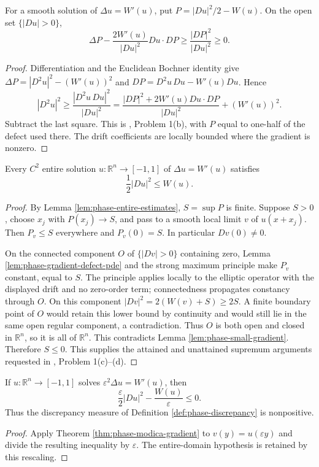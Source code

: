 \begin{lemma}\label{lem:phase-gradient-defect-pde}
For a smooth solution of $\Delta u=W'(u)$, put $P=|Du|^2/2-W(u)$. On the open set $\{|Du|>0\}$,
\[
 \Delta P-\frac{2W'(u)}{|Du|^2}Du\cdot DP
 \geq\frac{|DP|^2}{|Du|^2}\geq0.
\]
\end{lemma}
\begin{proof}
Differentiation and the Euclidean Bochner identity give
$\Delta P=|D^2u|^2-(W'(u))^2$ and $DP=D^2u\,Du-W'(u)Du$. Hence
\[
 |D^2u|^2\geq\frac{|D^2u\,Du|^2}{|Du|^2}
 =\frac{|DP|^2+2W'(u)Du\cdot DP}{|Du|^2}+(W'(u))^2.
\]
Subtract the last square. This is \cite{ChAC}, Problem 1(b), with $P$ equal to one-half of the defect used there. The drift coefficients are locally bounded where the gradient is nonzero.
\end{proof}

\begin{theorem}\label{thm:phase-modica-gradient}
Every $C^2$ entire solution $u:\mathbb R^n\to[-1,1]$ of $\Delta u=W'(u)$ satisfies
\[
 \frac12|Du|^2\leq W(u).
\]
\end{theorem}
\begin{proof}
By Lemma \ref{lem:phase-entire-estimates}, $S=\sup P$ is finite. Suppose $S>0$, choose $x_j$ with $P(x_j)\to S$, and pass to a smooth local limit $v$ of $u(x+x_j)$. Then $P_v\leq S$ everywhere and $P_v(0)=S$. In particular $Dv(0)\ne0$.

On the connected component $O$ of $\{|Dv|>0\}$ containing zero, Lemma \ref{lem:phase-gradient-defect-pde} and the strong maximum principle make $P_v$ constant, equal to $S$. The principle applies locally to the elliptic operator with the displayed drift and no zero-order term; connectedness propagates constancy through $O$. On this component $|Dv|^2=2(W(v)+S)\geq2S$. A finite boundary point of $O$ would retain this lower bound by continuity and would still lie in the same open regular component, a contradiction. Thus $O$ is both open and closed in $\mathbb R^n$, so it is all of $\mathbb R^n$. This contradicts Lemma \ref{lem:phase-small-gradient}. Therefore $S\leq0$. This supplies the attained and unattained supremum arguments requested in \cite{ChAC}, Problem 1(c)--(d).
\end{proof}

\begin{corollary}\label{cor:phase-modica-scaled}
If $u:\mathbb R^n\to[-1,1]$ solves $\varepsilon^2\Delta u=W'(u)$, then
\[
 \frac\varepsilon2|Du|^2-\frac{W(u)}\varepsilon\leq0.
\]
Thus the discrepancy measure of Definition \ref{def:phase-discrepancy} is nonpositive.
\end{corollary}
\begin{proof}
Apply Theorem \ref{thm:phase-modica-gradient} to $v(y)=u(\varepsilon y)$ and divide the resulting inequality by $\varepsilon$. The entire-domain hypothesis is retained by this rescaling.
\end{proof}

